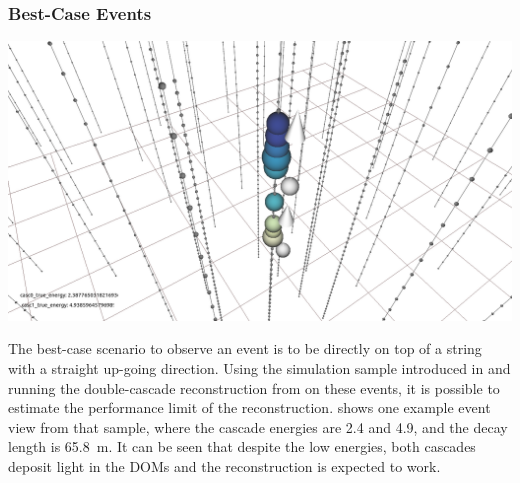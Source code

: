 \subsubsection{Best-Case Events}

\begin{marginfigure}
    \centering
    \includegraphics[trim=270 40 225 35, clip]{figures/model_independent_simulation/upgoing_e0_2.4_e1_4.9_v2.png}
    \caption[Event view of an up-going double-cascade event]{Event view of an up-going double-cascade event, with cascade energies of \SI{2.4}{\gev} and \SI{4.9}{\gev}, and a decay length of \SI{65.8}{\meter}. The colored spheres show the DOMs that have observed light, where the size is proportional to the number of observed photons and the color indicates the time (yellow is early, blue is late). The strings are shown as black lines, with small spheres indicating the DOM positions, and the true cascade vertices and directions are shown as white spheres with white arrows.}
\end{marginfigure}

The best-case scenario to observe an event is to be directly on top of a string with a straight up-going direction. Using the simulation sample introduced in  and running the double-cascade reconstruction from  on these events, it is possible to estimate the performance limit of the reconstruction.  shows one example event view from that sample, where the cascade energies are \SI{2.4}{\gev} and \SI{4.9}{\gev}, and the decay length is \SI{65.8}{\meter}. It can be seen that despite the low energies, both cascades deposit light in the DOMs and the reconstruction is expected to work.

